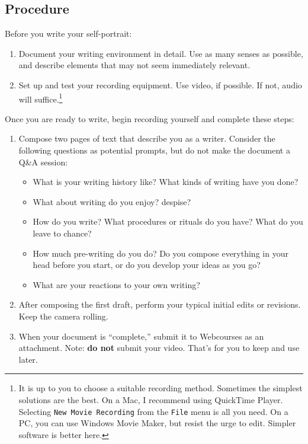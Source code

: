 \documentclass[10pt, oneside]{amsart}	%
\begin{document}
\begin{multicols}{2}
	\section{Procedure} %
	\label{sec:procedure}
Before you write your self-portrait:
		\begin{enumerate}
			\item Document your writing environment in detail. Use as many senses as possible, and describe elements that may not seem immediately relevant.
			\item Set up and test your recording equipment. Use video, if possible. If not, audio will suffice.\footnote{It is up to you to choose a suitable recording method. Sometimes the simplest solutions are the best. On a Mac, I recommend using QuickTime Player. Selecting \texttt{New Movie Recording} from the \texttt{File} menu is all you need. On a PC, you can use Windows Movie Maker, but resist the urge to edit. Simpler software is better here.}
		\end{enumerate}
Once you are ready to write, begin recording yourself and complete these steps:
	\begin{enumerate}
		\item Compose two pages of text that describe you as a writer. Consider the following questions as potential prompts, but do not make the document a Q\&A session:
		\begin{itemize}
			\item What is your writing history like? What kinds of writing have you done?
			\item What about writing do you enjoy? despise?
			\item How do you write? What procedures or rituals do you have? What do you leave to chance?
			\item How much pre-writing do you do? Do you compose everything in your head before you start, or do you develop your ideas as you go?
			\item What are your reactions to your own writing?
		\end{itemize}
		\item After composing the first draft, perform your typical initial edits or revisions. Keep the camera rolling.
		\item When your document is “complete‚” submit it to Webcourses as an attachment. Note: \textbf{do not} submit your video. That's for you to keep and use later.
	\end{enumerate}


\end{multicols}
\end{document}
